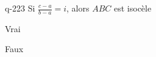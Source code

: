 \begin{truefalse}{q-223}
Si $\frac{c-a}{b-a} =i$, alors $ABC$ est isocèle
\item* Vrai
\item Faux
\end{truefalse}

